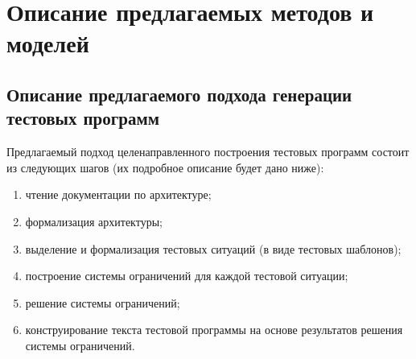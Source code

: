 \chapter{Описание предлагаемых методов и моделей}

\section{Описание предлагаемого подхода генерации тестовых программ}
Предлагаемый подход целенаправленного построения тестовых программ состоит из следующих шагов (их подробное описание будет дано ниже):
\begin{enumerate}
    \item чтение документации по архитектуре;
    \item формализация архитектуры;
    \item выделение и формализация тестовых ситуаций (в виде тестовых шаблонов);
    \item построение системы ограничений для каждой тестовой ситуации;
    \item решение системы ограничений;
    \item конструирование текста тестовой программы на основе результатов решения системы ограничений.
\end{enumerate}

